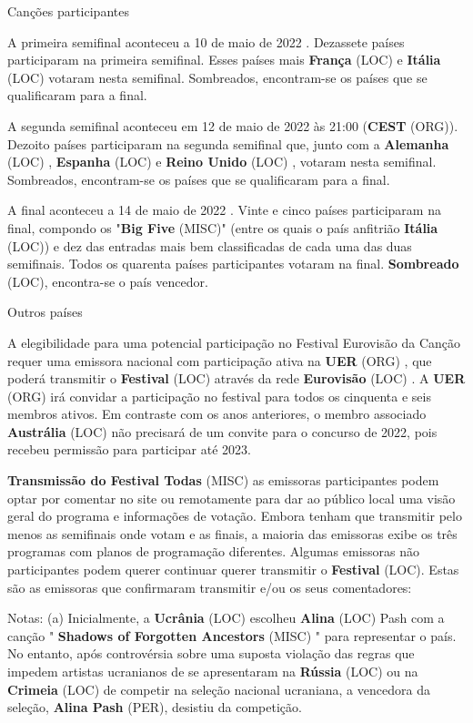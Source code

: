 \documentclass[12pt,a4paper]{article}
\begin{document}
Canções participantes

A primeira semifinal aconteceu a 10 de maio de 2022 . Dezassete países participaram na primeira semifinal. Esses países mais \textbf{França} (LOC) e \textbf{Itália} (LOC) votaram nesta semifinal. Sombreados, encontram-se os países que se qualificaram para a final.

A segunda semifinal aconteceu em 12 de maio de 2022 às 21:00 (\textbf{CEST} (ORG)). Dezoito países participaram na segunda semifinal que, junto com a \textbf{Alemanha} (LOC) , \textbf{Espanha} (LOC) e \textbf{Reino Unido} (LOC) , votaram nesta semifinal. Sombreados, encontram-se os países que se qualificaram para a final.

A final aconteceu a 14 de maio de 2022 . Vinte e cinco países participaram na final, compondo os "\textbf{Big Five} (MISC)" (entre os quais o país anfitrião \textbf{Itália} (LOC)) e dez das entradas mais bem classificadas de cada uma das duas semifinais. Todos os quarenta países participantes votaram na final. \textbf{Sombreado} (LOC), encontra-se o país vencedor.



Outros países

A elegibilidade para uma potencial participação no Festival Eurovisão da Canção requer uma emissora nacional com participação ativa na \textbf{UER} (ORG) , que poderá transmitir o \textbf{Festival} (LOC) através da rede \textbf{Eurovisão} (LOC) . A \textbf{UER} (ORG) irá convidar a participação no festival para todos os cinquenta e seis membros ativos. Em contraste com os anos anteriores, o membro associado \textbf{Austrália} (LOC) não precisará de um convite para o concurso de 2022, pois recebeu permissão para participar até 2023.



\textbf{Transmissão do Festival Todas} (MISC) as emissoras participantes podem optar por comentar no site ou remotamente para dar ao público local uma visão geral do programa e informações de votação. Embora tenham que transmitir pelo menos as semifinais onde votam e as finais, a maioria das emissoras exibe os três programas com planos de programação diferentes. Algumas emissoras não participantes podem querer continuar querer transmitir o \textbf{Festival} (LOC). Estas são as emissoras que confirmaram transmitir e/ou os seus comentadores:

Notas: (a) Inicialmente, a \textbf{Ucrânia} (LOC) escolheu \textbf{Alina} (LOC) Pash com a canção " \textbf{Shadows of Forgotten Ancestors} (MISC) " para representar o país. No entanto, após controvérsia sobre uma suposta violação das regras que impedem artistas ucranianos de se apresentaram na \textbf{Rússia} (LOC) ou na \textbf{Crimeia} (LOC) de competir na seleção nacional ucraniana, a vencedora da seleção, \textbf{Alina Pash} (PER), desistiu da competição.
\end{document}

